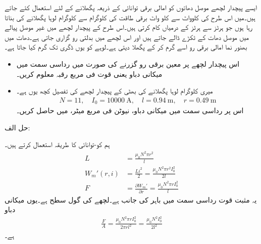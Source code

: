 ایسے پیچدار لچھے موصل دھاتوں کو امالی برقی توانائی کے ذریعہ پگھلانے کے لئے استعمال کئے جاتے ہیں۔میں اس طرح کی   کلوواٹ سے   کلو واٹ برقی طاقت کی   کلوگرام سے   کلوگرام  لوہا پگھلانے کی  بناتا رہا ہوں جو  ہرٹز سے   ہرٹز کے درمیاں کام کرتی ہیں۔اس طرح کے پیچدار لچھے میں غیر موصل پیالے میں موصل دھات کے ٹکڑے ڈالے جاتے ہیں اور اس لچھے میں بدلتی رو گزاری جاتی ہے۔دھات میں بھنور نما امالی برقی رو اسے گرم کر کے پگھلا دیتی ہے۔لوہے کو یوں   ڈگری  تک گرم کیا جاتا ہے۔
\begin{itemize}
\item
اس پیچدار لچھے پر معین برقی رو  گزرنے کی صورت میں رداسی سمت میں میکانی دباو یعنی قوت فی مربع رقبہ معلوم کریں۔
\item
میری  کلوگرام لوہا پگھلانے کی بھٹی کے پیچدار لچھے کی تفصیل کچھ یوں ہے۔
\begin{align*}
N=11, \quad I_0=\SI{10000}{\ampere}, \quad l=\SI{0.94}{\meter}, \quad r=\SI{0.49}{\meter}
\end{align*}
اس پر رداسی سمت میں میکانی دباو، نیوٹن فی مربع میٹر، میں حاصل کریں۔
\end{itemize}

حل الف:

ہم کو-توانائی کا طریقہ استعمال کرتے ہیں۔
\begin{align*}
L&=\frac{\mu_0 N^2 \pi r^2}{l}\\
W_m'(r,i)&=\frac{L i^2}{2}=\frac{\mu_0 N^2 \pi r^2 I_0^2}{2 l}\\
F&=\frac{\partial W_m'}{\partial r}=\frac{\mu_0 N^2 \pi r I_0^2}{l}
\end{align*}
یہ مثبت قوت رداسی سمت میں باہر کی جانب ہے۔لچھے کی گول سطح   ہے۔یوں میکانی دباو
\begin{align*}
\frac{F}{A}=\frac{\mu_0 N^2 \pi r I_0^2}{2\pi r l^2}=\frac{\mu_0 N^2  I_0^2}{2 l^2}
\end{align*}
ہے۔

